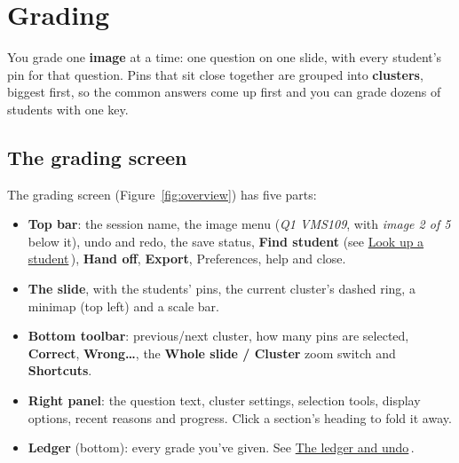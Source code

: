 \section{Grading}\label{sec:grading}

\label{sec:grading:grading}

You grade one \textbf{image} at a time: one question on one slide, with every student's pin for that question. Pins that sit close together are grouped into \textbf{clusters}, biggest first, so the common answers come up first and you can grade dozens of students with one key.


\subsection{The grading screen}\label{sec:grading:the-grading-screen}

The grading screen (Figure~\ref{fig:overview}) has five parts:

\begin{itemize}[topsep=2pt, itemsep=2pt]
\item \textbf{Top bar}: the session name, the image menu (\emph{Q1 \textperiodcentered{} VMS109}, with \emph{image 2 of 5} below it), undo and redo, the save status, \textbf{Find student} (see \href{https://github.com/agadin/micro-speed-grader/blob/main/docs/help/students.md}{Look up a student}\,\onlinemark{}), \textbf{Hand off}, \textbf{Export}, Preferences, help and close.
\item \textbf{The slide}, with the students' pins, the current cluster's dashed ring, a minimap (top left) and a scale bar.
\item \textbf{Bottom toolbar}: previous/next cluster, how many pins are selected, \textbf{Correct}, \textbf{Wrong\ldots{}}, the \textbf{Whole slide / Cluster} zoom switch and \textbf{Shortcuts}.
\item \textbf{Right panel}: the question text, cluster settings, selection tools, display options, recent reasons and progress. Click a section's heading to fold it away.
\item \textbf{Ledger} (bottom): every grade you've given. See \href{https://github.com/agadin/micro-speed-grader/blob/main/docs/help/ledger.md}{The ledger and undo}\,\onlinemark{}.
\end{itemize}

